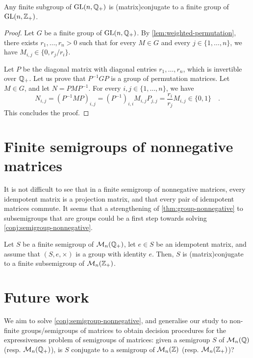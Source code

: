 \begin{theorem}
  \label{thm:group-nonnegative}
  Any finite subgroup of $\GL[n]{\Rat_+}$ is \kl(matrix){conjugate} to a finite group of
  $\GL[n]{\Int_+}$.
\end{theorem}
\begin{proof}
  Let $G$ be a finite group of $\GL[n]{\Rat_+}$.
  By \cref{lem:weighted-permutation}, there exists $r_1, \ldots, r_n > 0$ such that
  for every $M \in G$ and every $j \in \{1,
  \ldots, n\}$, we have $M_{i,j} \in \{0, r_j/r_i\}$.

  Let $P$ be the diagonal matrix with diagonal entries $r_1, \ldots, r_n$,
  which is invertible over $\Rat_+$.
  Let us prove that $P^{-1} G P$ is a group of permutation matrices.
  Let $M \in G$, and let $N = P M P^{-1}$.
  For every $i, j \in \{1, \ldots, n\}$, we have
  \begin{equation}
    N_{i,j} = (P^{-1} M P)_{i,j}
    = (P^{-1})_{i,i} M_{i,j} P_{j,j}
    = \frac{r_i}{r_j} M_{i,j} \in \{0, 1\}
    \quad .
  \end{equation}  
  This concludes the proof.
\end{proof}

\section{Finite semigroups of nonnegative matrices}

It is not difficult to see that in a finite semigroup of nonnegative matrices,
every idempotent matrix is a projection matrix, and that every pair of
idempotent matrices commute. It seems that a strengthening of 
\cref{thm:group-nonnegative} to subsemigroups that are groups 
could be a first step towards solving \cref{conj:semigroup-nonnegative}.

\begin{conjecture}
  \label{conj:subgroup-nonnegative}
  Let $S$ be a finite semigroup of $\Mat[n]{\Rat_+}$, 
  let $e \in S$ be an idempotent matrix, and assume that 
  $(S, e, \times)$ is a group with identity $e$. Then, $S$ is
  \kl(matrix){conjugate} to a finite subsemigroup 
  of $\Mat[n]{\Int_+}$.
\end{conjecture}

\section{Future work}

We aim to solve \cref{conj:semigroup-nonnegative}, and generalise our study to
non-finite groups/semigroups of matrices to obtain decision procedures for the
expressiveness problem of semigroups of matrices: given a semigroup $S$ of
$\Mat[n]{\Rat}$ (resp. $\Mat[n]{\Rat_+}$), is $S$ conjugate to a semigroup of
$\Mat[n]{\Int}$ (resp. $\Mat[n]{\Int_+}$)?

